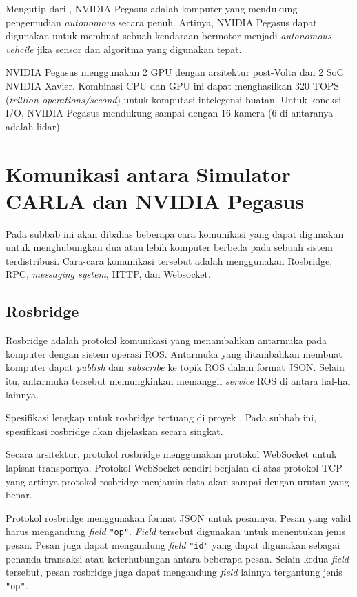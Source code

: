 Mengutip dari \parencite{oh_2017}, NVIDIA Pegasus adalah komputer yang
mendukung pengemudian \textit{autonomous} secara penuh. Artinya, NVIDIA Pegasus
dapat digunakan untuk membuat sebuah kendaraan bermotor menjadi
\textit{autonomous vehcile} jika sensor dan algoritma yang digunakan tepat.

NVIDIA Pegasus menggunakan 2 GPU dengan arsitektur post-Volta dan 2 SoC NVIDIA
Xavier. Kombinasi CPU dan GPU ini dapat menghasilkan 320 TOPS (\textit{trillion
      operations/second}) untuk komputasi intelegensi buatan. Untuk koneksi I/O,
NVIDIA Pegasus mendukung sampai dengan 16 kamera (6 di antaranya adalah lidar).


\section{Komunikasi antara Simulator CARLA dan NVIDIA Pegasus}

Pada subbab ini akan dibahas beberapa cara komunikasi yang dapat digunakan
untuk menghubungkan dua atau lebih komputer berbeda pada sebuah sistem
terdistribusi. Cara-cara komunikasi tersebut adalah menggunakan Rosbridge, RPC,
\textit{messaging system}, HTTP, dan Websocket.

\subsection{Rosbridge}

Rosbridge adalah protokol komunikasi yang menambahkan antarmuka pada komputer
dengan sistem operasi ROS. Antarmuka yang ditambahkan membuat komputer dapat
\textit{publish} dan \textit{subscribe} ke topik ROS dalam format JSON. Selain
itu, antarmuka tersebut memungkinkan memanggil \textit{service} ROS di antara
hal-hal lainnya.

Spesifikasi lengkap untuk rosbridge tertuang di proyek \parencite{ros_bridge}.
Pada subbab ini, spesifikasi rosbridge akan dijelaskan secara singkat.

Secara arsitektur, protokol rosbridge menggunakan protokol WebSocket untuk
lapisan transpornya. Protokol WebSocket sendiri berjalan di atas protokol TCP
yang artinya protokol rosbridge menjamin data akan sampai dengan urutan yang
benar.

Protokol rosbridge menggunakan format JSON untuk pesannya. Pesan yang valid
harus mengandung \textit{field} \texttt{"op"}. \textit{Field} tersebut
digunakan untuk menentukan jenis pesan. Pesan juga dapat mengandung
\textit{field} \texttt{"id"} yang dapat digunakan sebagai penanda transaksi
atau keterhubungan antara beberapa pesan. Selain kedua \textit{field} tersebut,
pesan rosbridge juga dapat mengandung \textit{field} lainnya tergantung jenis
\texttt{"op"}.

